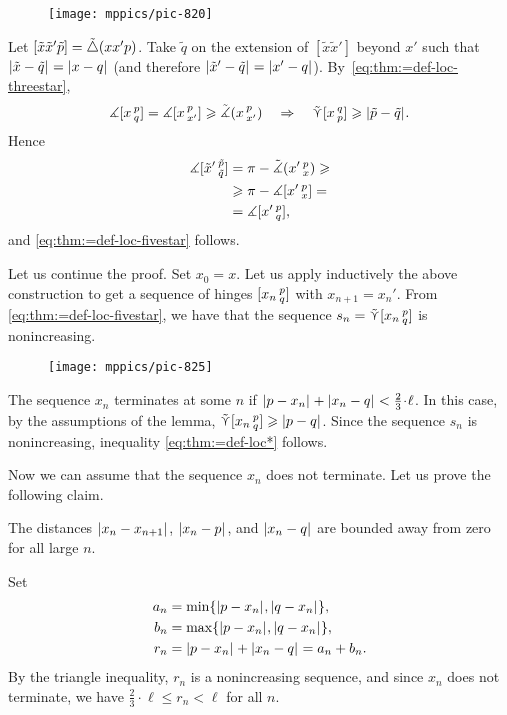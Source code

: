 {

\begin{wrapfigure}{r}{30 mm}
\vskip-8mm
\centering
\texttt{[image: mppics/pic-820]}
\vskip-4mm
\end{wrapfigure}

Let
$[\tilde x\tilde x'\tilde p]=\tilde\triangle(x x' p)$.
Take $\tilde  q$ on the extension of $[\tilde  x\tilde  x']$ beyond $x'$ such that $|{\tilde x}-{\tilde q}|_{}^{{}}=|{x}-{q}|_{}^{{}}$ (and therefore $|{\tilde x'}-{\tilde q}|_{}^{{}}=|{x'}-{q}|_{}^{{}}$).
By~\ref{eq:thm:=def-loc-threestar},
\[\measuredangle[x\,{}^{p}_{q}]
=\measuredangle[x\,{}^{p}_{x'}]\geqslant\tilde\measuredangle(x\,{}^{p}_{x'})\quad \Rightarrow\quad 
\mathop{\tilde\curlyvee}\nolimits [x\,{}^{q}_{p}]\geqslant|{\tilde p}-{\tilde q}|_{}^{{}}.\]
Hence
\begin{align*}
\measuredangle[\tilde x'\,{}^{\tilde p}_{\tilde q}]&= 
\pi
-\tilde\measuredangle(x'\,{}^{p}_{x})
\geqslant
\\
&\geqslant
\pi-\measuredangle[x'\,{}^{p}_{x}]
=
\\
&=
\measuredangle[x'\,{}^{p}_{q}],
\end{align*}
and \ref{eq:thm:=def-loc-fivestar} follows.

}

\medskip

Let us continue the proof.
Set $x_0=x$.
Let us apply inductively the above construction to get a sequence of hinges  $[x_n\,{}^{p}_{q}]$ with $x_{n+1}=x_n'$.
From \ref{eq:thm:=def-loc-fivestar}, we have that the sequence  $s_n=\mathop{\tilde\curlyvee}\nolimits [x_n\,{}^{p}_{q}]$ is nonincreasing.
\begin{figure}[ht!]
\centering
\texttt{[image: mppics/pic-825]}
\end{figure}

The sequence $x_n$ terminates at some $n$ if
$\dist{p}{x_n}{}+\dist{x_n}{q}{}
\z<\tfrac{2}{3}\cdot\ell$.
In this case, by the assumptions of the lemma, $\mathop{\tilde\curlyvee}\nolimits [x_n\,{}^{p}_{q}]\geqslant|{p}-{q}|_{}^{{}}$.
Since the sequence $s_n$ is nonincreasing, inequality \ref{eq:thm:=def-loc*} follows.

Now we can assume that the sequence $x_n$ does not terminate.
Let us prove the following claim.
\begin{clm}{}\label{clm:>0}
The distances
$|{x_n}-{x_{n+1}}|_{}^{{}}$, $|{x_n}-{p}|_{}^{{}}$, and $|{x_n}-{q}|_{}^{{}}$ are bounded away from zero for all large $n$.
\end{clm}

Set
\begin{align*}
a_n&=\min\{|{p}-{x_n}|_{}^{{}},|{q}-{x_n}|_{}^{{}}\},
\\
b_n&=\max\{|{p}-{x_n}|_{}^{{}},|{q}-{x_n}|_{}^{{}}\},
\\
r_n&=|{p}-{x_n}|_{}^{{}}+|{x_n}-{q}|_{}^{{}}=a_n+b_n.
\end{align*}
By the triangle inequality, $r_n$ is a nonincreasing sequence,
and since $x_n$ does not terminate, we have $\tfrac{2}{3}\cdot\ell\le r_n<\ell$ for all $n$.

